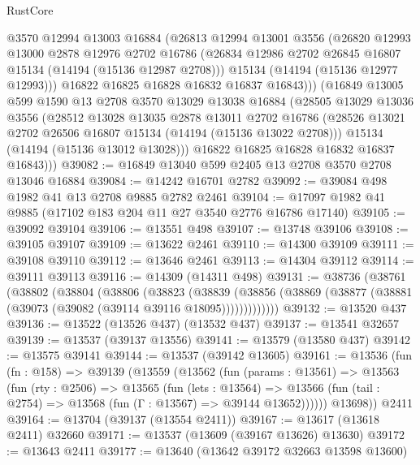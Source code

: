 \begin{lexlean}{RustCore}
\begin{coremodule}
          @3570
          @12994
          @13003
          @16884
          (@26813
            @12994
            @13001
            @3556
            (@26820
              @12993
              @13000
              @2878
              @12976
              @2702
              @16786
              (@26834 @12986 @2702 @26845 @16807 @15134 (@14194 (@15136 @12987 @2708)))
              @15134
              (@14194 (@15136 @12977 @12993)))
            @16822
            @16825
            @16828
            @16832
            @16837
            @16843)))
      (@16849
        @13005
        @599
        @1590
        @13
        @2708
        @3570
        @13029
        @13038
        @16884
        (@28505
          @13029
          @13036
          @3556
          (@28512
            @13028
            @13035
            @2878
            @13011
            @2702
            @16786
            (@28526 @13021 @2702 @26506 @16807 @15134 (@14194 (@15136 @13022 @2708)))
            @15134
            (@14194 (@15136 @13012 @13028)))
          @16822
          @16825
          @16828
          @16832
          @16837
          @16843)))
@39082 := @16849 @13040 @599 @2405 @13 @2708 @3570 @2708 @13046 @16884
@39084 := @14242 @16701 @2782
@39092 := @39084 @498 @1982 @41 @13 @2708 @9885 @2782 @2461
@39104 := @17097 @1982 @41 @9885 (@17102 @183 @204 @11 @27 @3540 @2776 @16786 @17140)
@39105 := @39092 @39104
@39106 := @13551 @498
@39107 := @13748 @39106
@39108 := @39105 @39107
@39109 := @13622 @2461
@39110 := @14300 @39109
@39111 := @39108 @39110
@39112 := @13646 @2461
@39113 := @14304 @39112
@39114 := @39111 @39113
@39116 := @14309 (@14311 @498)
@39131 := @38736
    (@38761
      (@38802
        (@38804
          (@38806
            (@38823
              (@38839
                (@38856 (@38869 (@38877 (@38881 (@39073 (@39082 (@39114 @39116 @18095)))))))))))))
@39132 := @13520 @437
@39136 := @13522 (@13526 @437) (@13532 @437)
@39137 := @13541 @32657
@39139 := @13537 (@39137 @13556)
@39141 := @13579 (@13580 @437)
@39142 := @13575 @39141
@39144 := @13537 (@39142 @13605)
@39161 := @13536
    (fun (fn : @158) =>
    @39139
      (@13559
        (@13562
          (fun (params : @13561) =>
          @13563
            (fun (rty : @2506) =>
            @13565
              (fun (lets : @13564) =>
              @13566 (fun (tail : @2754) => @13568 (fun (Γ : @13567) => @39144 @13652))))))
        @13698))
    @2411
@39164 := @13704 (@39137 (@13554 @2411))
@39167 := @13617 (@13618 @2411) @32660
@39171 := @13537 (@13609 (@39167 @13626) @13630)
@39172 := @13643 @2411
@39177 := @13640 (@13642 @39172 @32663 @13598 @13600)

\end{coremodule}
\end{lexlean}

